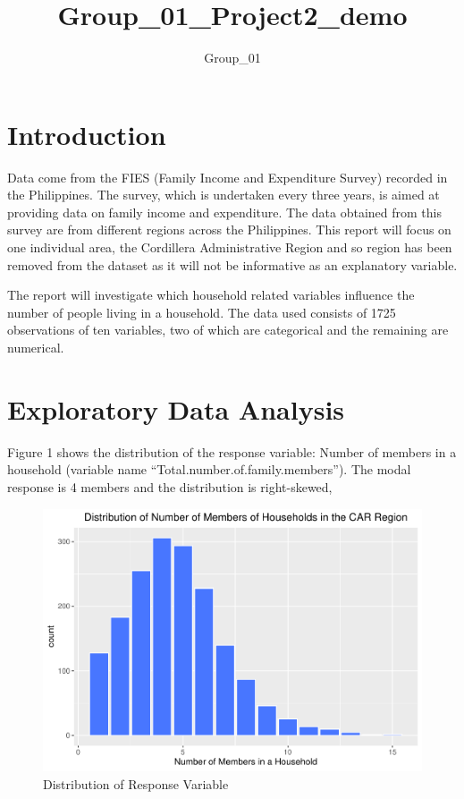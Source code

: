 \documentclass[
]{article}
\title{Group\_01\_Project2\_demo}
\author{Group\_01}
\date{}
\begin{document}
\maketitle

\hypertarget{sec:Intro}{%
\section{Introduction}\label{sec:Intro}}

Data come from the FIES (Family Income and Expenditure Survey) recorded
in the Philippines. The survey, which is undertaken every three years,
is aimed at providing data on family income and expenditure. The data
obtained from this survey are from different regions across the
Philippines. This report will focus on one individual area, the
Cordillera Administrative Region and so region has been removed from the
dataset as it will not be informative as an explanatory variable.

The report will investigate which household related variables influence
the number of people living in a household. The data used consists of
1725 observations of ten variables, two of which are categorical and the
remaining are numerical.

\hypertarget{sec:EDA}{%
\section{Exploratory Data Analysis}\label{sec:EDA}}

Figure 1 shows the distribution of the response variable: Number of
members in a household (variable name
``Total.number.of.family.members''). The modal response is 4 members and
the distribution is right-skewed,

\begin{figure}[H]

{\centering \includegraphics[width=0.8\linewidth]{Group_01_Project2_demo_files/figure-latex/distribution of response variable-1} 

}

\caption{Distribution of Response Variable}\label{fig:distribution of response variable}
\end{figure}
\end{document}
